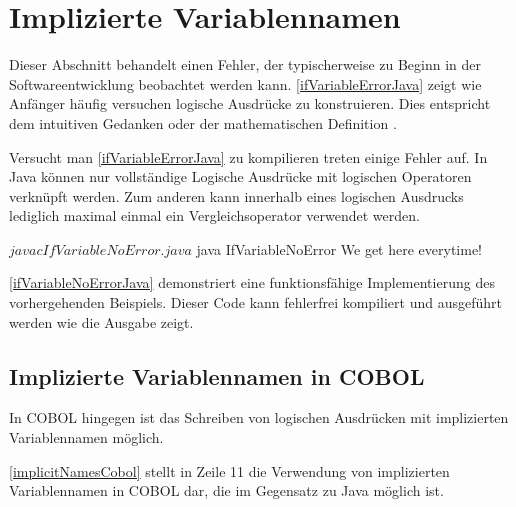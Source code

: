 \section{Implizierte Variablennamen}

Dieser Abschnitt behandelt einen Fehler, der typischerweise zu Beginn in der Softwareentwicklung beobachtet werden kann. \autoref{ifVariableErrorJava} zeigt wie Anfänger häufig versuchen logische Ausdrücke zu konstruieren. Dies entspricht dem intuitiven Gedanken  oder der mathematischen Definition .\\

\sepCodeAndOutputCheck
\begin{shellwindow}
$ javac -Xmaxerrs 3 IfVariableError.java 
IfVariableError.java:4: error: > expected
        if (System.currentTimeMillis() > 0 && < Long.MAX_VALUE) {
                                                              ^
IfVariableError.java:4: error: ')' expected
        if (System.currentTimeMillis() > 0 && < Long.MAX_VALUE) {
                                                               ^
IfVariableError.java:8: error: illegal start of type
        if (0 < System.currentTimeMillis() < Long.MAX_VALUE) {
        ^
3 errors
\end{shellwindow}

Versucht man \autoref{ifVariableErrorJava} zu kompilieren treten einige Fehler auf. In Java können nur vollständige Logische Ausdrücke mit logischen Operatoren verknüpft werden. Zum anderen kann innerhalb eines logischen Ausdrucks lediglich maximal einmal ein Vergleichsoperator verwendet werden. \\

\sepCodeAndOutputCheck
\begin{shellwindow}
$ javac IfVariableNoError.java 
$ java IfVariableNoError
We get here everytime!
\end{shellwindow}

\autoref{ifVariableNoErrorJava} demonstriert eine funktionsfähige Implementierung des vorhergehenden Beispiels. Dieser Code kann fehlerfrei kompiliert und ausgeführt werden wie die Ausgabe zeigt.\\

\subsection*{Implizierte Variablennamen in COBOL}

In COBOL hingegen ist das Schreiben von logischen Ausdrücken mit implizierten Variablennamen möglich.\\


\autoref{implicitNamesCobol} stellt in Zeile 11 die Verwendung von implizierten Variablennamen in COBOL dar, die im Gegensatz zu Java möglich ist.